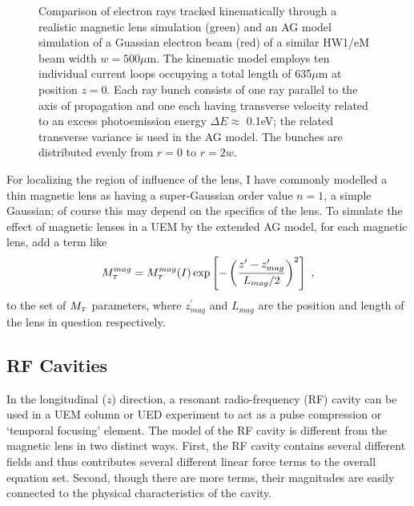 \begin{figure}
  \centering
  
  \caption[Comparison of the AG model and a kinematic model of a magnetic lens]{
    Comparison of electron rays tracked kinematically through a realistic magnetic lens simulation (green) and an AG model simulation of a Guassian electron beam (red) of a similar HW1/eM beam width $ w = 500 \mu\text{m} $.
    The kinematic model employs ten individual current loops occupying a total length of 635$\mu$m at position $z=0$.
    Each ray bunch consists of one ray parallel to the axis of propagation and one each having transverse velocity related to an excess photoemission energy $\Delta E \approx $ 0.1eV; the related transverse variance is used in the AG model.
    The bunches are distributed evenly from $r=0$ to $r = 2 w$.
  }
  \label{fig:mag_lens_loops}
\end{figure}

For localizing the region of influence of the lens, I have commonly modelled a thin magnetic lens as having a super-Gaussian order value $n=1$, a simple Gaussian; of course this may depend on the specifics of the lens.
To simulate the effect of magnetic lenses in a UEM by the extended AG model, for each magnetic lens, add a term like
\begin{equation} \label{eq:reg_of_influence}
  M_{{\scriptscriptstyle T}}^{mag} = M_{{\scriptscriptstyle T}}^{mag}(I) \exp \left [ - \left (  \frac{ z^{\prime} - z_{mag}^{\prime} }{ L_{mag} / 2 } \right )^{ 2 } \right ] \text{ ,}
\end{equation}
to the set of $M_{{\scriptscriptstyle T}}$ parameters, where $z_{mag}^{\prime}$ and $L_{mag}$ are the position and length of the lens in question respectively.

\subsection{RF Cavities}

In the longitudinal ($ z $) direction, a resonant radio-frequency (RF) cavity can be used in a UEM column or UED experiment \cite{oudheusden_electron_2007,fill_sub-fs_2006} to act as a pulse compression or `temporal focusing' element.
The model of the RF cavity is different from the magnetic lens in two distinct ways.
First, the RF cavity contains several different fields and thus contributes several different linear force terms to the overall equation set.
Second, though there are more terms, their magnitudes are easily connected to the physical characteristics of the cavity.

